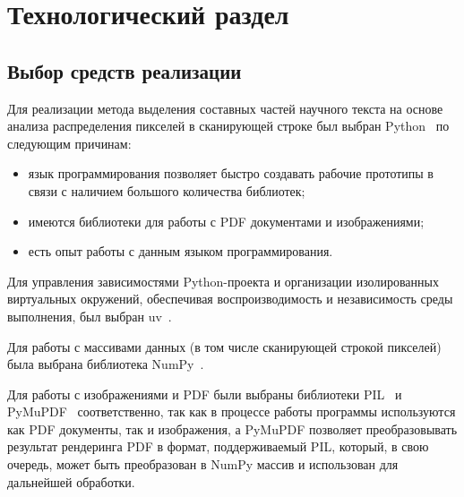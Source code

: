 \section{Технологический раздел}



\subsection{Выбор средств реализации}


Для реализации метода выделения составных частей научного текста на основе анализа распределения пикселей в сканирующей строке был выбран Python~\cite{python} по следующим причинам:
\begin{itemize}
    \item язык программирования позволяет быстро создавать рабочие прототипы в связи с наличием большого количества библиотек;
    \item имеются библиотеки для работы с PDF документами и изображениями;
    \item есть опыт работы с данным языком программирования.
\end{itemize}

Для управления зависимостями Python-проекта и организации изолированных виртуальных окружений, обеспечивая воспроизводимость и независимость среды выполнения, был выбран uv~\cite{uv}.

Для работы с массивами данных (в том числе сканирующей строкой пикселей) была выбрана библиотека NumPy~\cite{numpy}.

Для работы с изображениями и PDF были выбраны библиотеки PIL~\cite{pil} и PyMuPDF~\cite{pymupdf} соответственно, так как в процессе работы программы используются как PDF документы, так и изображения, а PyMuPDF позволяет преобразовывать результат рендеринга PDF в формат, поддерживаемый PIL, который, в свою очередь, может быть преобразован в NumPy массив и использован для дальнейшей обработки.

